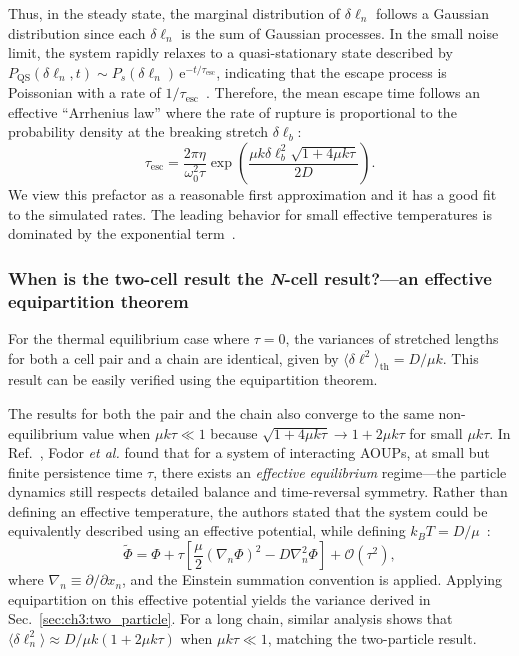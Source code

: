 Thus, in the steady state, the marginal distribution of $\delta\ell_n$ follows a Gaussian distribution since each $\delta \ell_n$ is the sum of Gaussian processes. In the small noise limit, the system rapidly relaxes to a quasi-stationary state described by $P_\mathrm{QS}(\delta\ell_n,t)\sim P_s(\delta\ell_n)\,\mathrm{e}^{-t/\tau_\mathrm{esc}}$, indicating that the escape process is Poissonian with a rate of $1/\tau_\mathrm{esc}$~\cite{woillez2020active}. Therefore, the mean escape time follows an effective ``Arrhenius law'' where the rate of rupture is proportional to the probability density at the breaking stretch $\delta \ell_b$:
\begin{equation}
\tau_\textrm{esc}=\frac{2\pi\eta}{\omega_0^2\tau}\exp\left(\frac{\mu k\delta\ell_b^2\sqrt{1+4\mu k\tau}}{2D}\right).
\end{equation}
We view this prefactor as a reasonable first approximation and it has a good fit to the simulated rates. The leading behavior for small effective temperatures is dominated by the exponential term~\cite{woillez2020active}.


\subsubsection{When is the two-cell result the \textit{N}-cell result?---an effective equipartition theorem}
\label{sec:ch3:equipartition}

For the thermal equilibrium case where $\tau=0$, the variances of stretched lengths for both a cell pair and a chain are identical, given by $\langle\delta\ell^2\rangle_\mathrm{th}=D/\mu k$. This result can be easily verified using the equipartition theorem.

The results for both the pair and the chain also converge to the same non-equilibrium value when $\mu k\tau \ll 1$ because $\sqrt{1+4\mu k\tau}\to 1+2\mu k\tau$ for small $\mu k \tau$. In Ref.~\cite{fodor2016far}, Fodor \textit{et al.} found that for a system of interacting AOUPs, at small but finite persistence time $\tau$, there exists an \emph{effective equilibrium} regime---the particle dynamics still respects detailed balance and time-reversal symmetry. Rather than defining an effective temperature, the authors stated that the system could be equivalently described using an effective potential, while defining $k_B T =D/\mu$~\cite{fodor2016far,martin2021statistical}:
\begin{equation}
   \tilde{\Phi} = \Phi + \tau\left[\frac{\mu}{2}(\nabla_n \Phi)^2 - D\nabla^2_n \Phi\right] +\mathcal{O}(\tau^2),
\end{equation}
where $\nabla_n \equiv \partial/\partial{x_n}$, and the Einstein summation convention is applied. Applying equipartition on this effective potential yields the variance derived in Sec.~\ref{sec:ch3:two_particle}. For a long chain, similar analysis shows that $\langle\delta\ell_n^2\rangle \approx D/\mu k(1+2\mu k\tau)$ when $\mu k\tau\ll 1$, matching the two-particle result.



